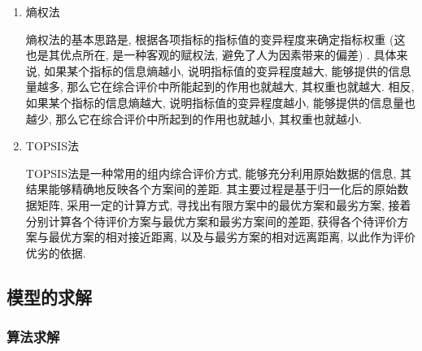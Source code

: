 \documentclass[11pt, fontset = windows]{article}
\begin{document}
\begin{enumerate}

    \item 熵权法

          熵权法的基本思路是, 根据各项指标的指标值的变异程度来确定指标权重 (这也是其优点所在, 是一种客观的赋权法, 避免了人为因素带来的偏差) .
          具体来说, 如果某个指标的信息熵越小, 说明指标值的变异程度越大, 能够提供的信息量越多, 那么它在综合评价中所能起到的作用也就越大, 其权重也就越大.
          相反, 如果某个指标的信息熵越大, 说明指标值的变异程度越小, 能够提供的信息量也越少, 那么它在综合评价中所起到的作用也就越小, 其权重也就越小.

    \item TOPSIS法

          TOPSIS法是一种常用的组内综合评价方式, 能够充分利用原始数据的信息, 其结果能够精确地反映各个方案间的差距.
          其主要过程是基于归一化后的原始数据矩阵, 采用一定的计算方式, 寻找出有限方案中的最优方案和最劣方案, 接着分别计算各个待评价方案与最优方案和最劣方案间的差距, 获得各个待评价方案与最优方案的相对接近距离, 以及与最劣方案的相对远离距离, 以此作为评价优劣的依据.

\end{enumerate}

\subsection[]{模型的求解}

\subsubsection[]{算法求解}
\end{document}
